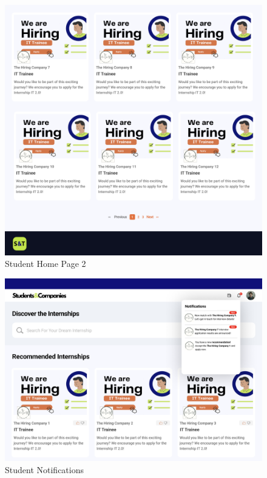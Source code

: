 \documentclass[a4paper,12pt]{article}
\begin{document}
\begin{figure}[H]
    \centering
    \includegraphics[scale = 0.40]{figures/UserInterfaces/Student/HomePage2.png}
    \caption{Student Home Page 2}
     \centering
\end{figure}

\begin{figure}[H]
    \centering
    \includegraphics[scale = 0.435]{figures/UserInterfaces/Student/Notifications.png}
    \caption{Student Notifications}
     \centering
\end{figure}
\end{document}
